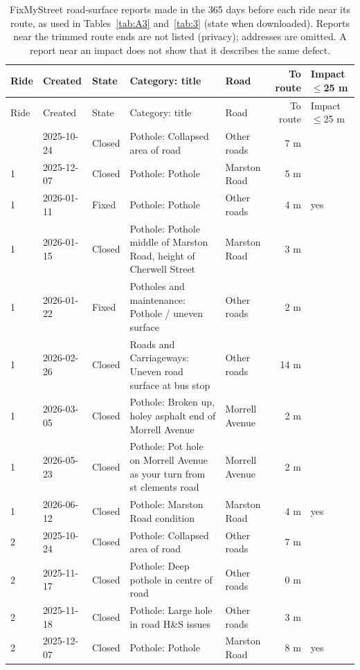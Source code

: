 \begingroup\small
\begin{longtable}{@{}lll>{\raggedright\arraybackslash}p{46mm}lrl@{}}
\caption{FixMyStreet road-surface reports made in the 365 days before each ride near its route, as used in Tables~\ref{tab:A3} and~\ref{tab:3} (state when downloaded). Reports near the trimmed route ends are not listed (privacy); addresses are omitted. A report near an impact does not show that it describes the same defect.}\label{tab:Areports}\\
\toprule
Ride & Created & State & Category: title & Road & To route & Impact $\leq$25 m \\
\midrule
\endfirsthead
\toprule
Ride & Created & State & Category: title & Road & To route & Impact $\leq$25 m \\
\midrule
\endhead
\bottomrule
\endlastfoot
1 & 2025-10-24 & Closed & Pothole: Collapsed area of road & Other roads & 7 m &  \\
1 & 2025-12-07 & Closed & Pothole: Pothole & Marston Road & 5 m &  \\
1 & 2026-01-11 & Fixed & Pothole: Pothole & Other roads & 4 m & yes \\
1 & 2026-01-15 & Closed & Pothole: Pothole middle of Marston Road, height of Cherwell Street & Marston Road & 3 m &  \\
1 & 2026-01-22 & Fixed & Potholes and maintenance: Pothole / uneven surface & Other roads & 2 m &  \\
1 & 2026-02-26 & Closed & Roads and Carriageways: Uneven road surface at bus stop & Other roads & 14 m &  \\
1 & 2026-03-05 & Closed & Pothole: Broken up, holey asphalt end of Morrell Avenue & Morrell Avenue & 2 m &  \\
1 & 2026-05-23 & Closed & Pothole: Pot hole on Morrell Avenue as your turn from st clements road & Morrell Avenue & 2 m &  \\
1 & 2026-06-12 & Closed & Pothole: Marston Road condition & Marston Road & 4 m & yes \\
\midrule
2 & 2025-10-24 & Closed & Pothole: Collapsed area of road & Other roads & 7 m &  \\
2 & 2025-11-17 & Closed & Pothole: Deep pothole in centre of road & Other roads & 0 m &  \\
2 & 2025-11-18 & Closed & Pothole: Large hole in road H\&S issues & Other roads & 3 m &  \\
2 & 2025-12-07 & Closed & Pothole: Pothole & Marston Road & 8 m & yes \\

\end{longtable}
